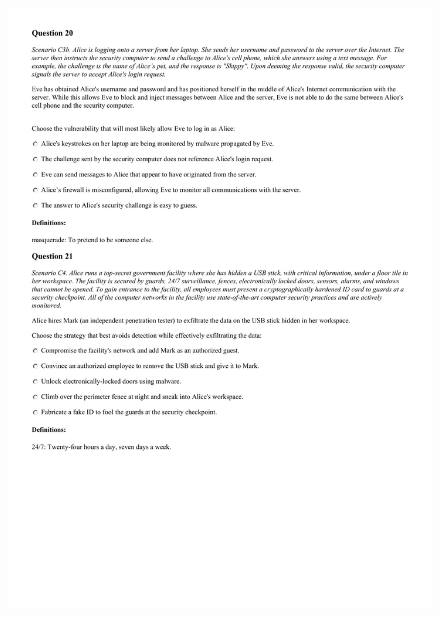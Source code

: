 \begin{figure}[!h]
    \begin{center}
    \advance\leftskip-3cm
    \advance\rightskip-3cm
    \includegraphics[scale=.25]{images/exam/correctly_formated_exam-09.jpg}
    \label{fig:correctly_formated_exam-09}
\end{center}
\end{figure}


